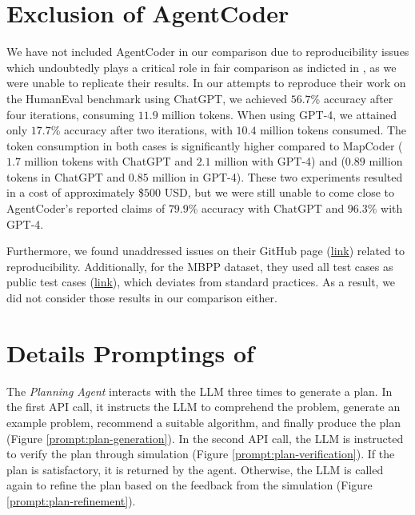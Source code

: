 \section{Exclusion of AgentCoder}
\label{app:elimination-of-agentcoder}
We have not included AgentCoder \cite{huang2023agentcoder} in our comparison due to reproducibility issues which undoubtedly plays a critical role in fair comparison as indicted in \citet{laskar-etal-2024-systematic}, as we were unable to replicate their results. In our attempts to reproduce their work on the HumanEval benchmark using ChatGPT, we achieved $56.7$\% accuracy after four iterations, consuming $11.9$ million tokens. When using GPT-4, we attained only $17.7$\% accuracy after two iterations, with $10.4$ million tokens consumed. The token consumption in both cases is significantly higher compared to MapCoder ($1.7$ million tokens with ChatGPT and $2.1$ million with GPT-4) and \toolnospace($0.89$ million tokens in ChatGPT and $0.85$ million in GPT-4). These two experiments resulted in a cost of approximately \$$500$ USD, but we were still unable to come close to AgentCoder's reported claims of $79.9$\% accuracy with ChatGPT and $96.3$\% with GPT-4.

Furthermore, we found unaddressed issues on their GitHub page (\href{https://github.com/huangd1999/AgentCoder/issues/8}{link}) related to reproducibility. Additionally, for the MBPP dataset, they used all test cases as public test cases (\href{https://github.com/huangd1999/AgentCoder/issues/3}{link}), which deviates from standard practices. As a result, we did not consider those results in our comparison either.

\section{Details Promptings of \tool}
\label{app:prompts}

The \emph{Planning Agent} interacts with the LLM three times to generate a plan. In the first API call, it instructs the LLM to comprehend the problem, generate an example problem, recommend a suitable algorithm, and finally produce the plan (Figure \ref{prompt:plan-generation}). In the second API call, the LLM is instructed to verify the plan through simulation (Figure \ref{prompt:plan-verification}). If the plan is satisfactory, it is returned by the agent. Otherwise, the LLM is called again to refine the plan based on the feedback from the simulation (Figure \ref{prompt:plan-refinement}).

